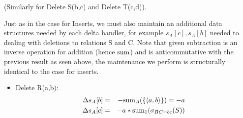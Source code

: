 \begin{example}
(Similarly for Delete S(b,c) and Delete T(c,d)).

Just as in the case for Inserts, we must also maintain an additional data
structures needed by each delta handler, for example $s_{A}[c], s_{A}[b]$ needed
to dealing with deletions to relations S and C. Note that given subtraction is an
inverse operation for addition (hence $\mathrm{sum}$) and is anticommutative with the
previous result as seen above, the maintenance we perform is
structurally identical to the case for inserts. 

\begin{itemize}
\item
Delete R(a,b):
\begin{eqnarray*}
\Delta s_{A}[b] &=& - \mathrm{sum}_{A}(\{{\langle a,b\rangle}\}) = -a\\
\Delta s_{A}[c] &=& -a * \mathrm{sum}_{1}(\sigma_{BC=bc}(S))
\end{eqnarray*}
\end{itemize}
\end{example}


